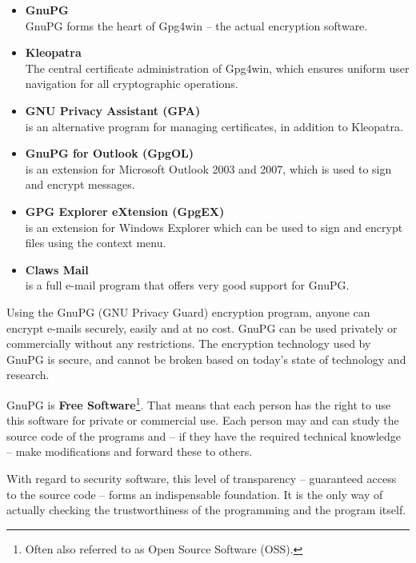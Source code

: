 \documentclass[a4paper,11pt,oneside,openright,titlepage]{scrbook}
\newcommand{\Email}{e-mail}
\begin{document}
\begin{itemize}
    \item \textbf{GnuPG}\\ GnuPG forms the heart of
        Gpg4win -- the actual encryption software.
    \item \textbf{Kleopatra}\\ The central
        certificate administration of
        Gpg4win, which ensures uniform user navigation for all
        cryptographic operations.
    \item \textbf{GNU Privacy Assistant (GPA)}\\ is an alternative program for
        managing certificates, in addition to Kleopatra.
    \item \textbf{GnuPG for Outlook (GpgOL)}\\ is an extension for
        Microsoft Outlook 2003 and 2007, which is used to sign and
        encrypt messages.
   \item \textbf{GPG Explorer eXtension (GpgEX)}\\ is an extension for
       Windows Explorer which can be used to
       sign and encrypt files using the context menu.
    \item \textbf{Claws Mail}\\ is a
        full \Email{} program that offers very good support for GnuPG.
\end{itemize}

Using the GnuPG (GNU Privacy Guard) encryption program,
anyone can encrypt \Email{}s securely, easily and at no cost. GnuPG can be
used privately or commercially without any restrictions. The
encryption technology used by GnuPG is secure, and cannot be broken
based on today's state of technology and research.

GnuPG is \textbf{Free Software}\footnote{Often also referred to as
Open Source Software (OSS).}. That means that
each person has the right to use this software for private or
commercial use. Each person may and can study the source code of the
programs and -- if they have the required technical knowledge -- make
modifications and forward these to others.

With regard to security software, this level of transparency --
guaranteed access to the source code -- forms an indispensable
foundation. It is the only way of actually checking the
trustworthiness of the programming and the program itself.
\end{document}
